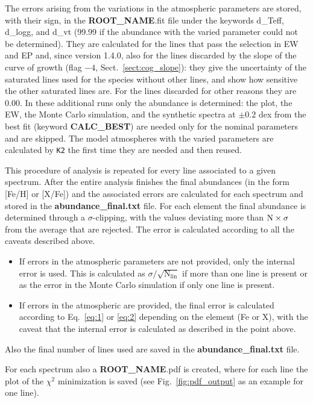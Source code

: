 \documentclass[modern]{aastex701}
\begin{document}
The errors arising from the variations in the atmospheric parameters are stored, with their sign, in the {\bf ROOT\_NAME}.fit file under the keywords d\_Teff, d\_logg, and d\_vt (99.99 if the abundance with the varied parameter could not be determined). They are calculated for the lines that pass the selection in EW and EP and, since version 1.4.0, also for the lines discarded by the slope of the curve of growth (flag $-4$, Sect.~\ref{sect:cog_slope}): they give the uncertainty of the saturated lines used for the species without other lines, and show how sensitive the other saturated lines are. For the lines discarded for other reasons they are 0.00. In these additional runs only the abundance is determined: the plot, the EW, the Monte Carlo simulation, and the synthetic spectra at $\pm 0.2$ dex from the best fit (keyword {\bf CALC\_BEST}) are needed only for the nominal parameters and are skipped. The model atmospheres with the varied parameters are calculated by \texttt{K2} the first time they are needed and then reused. 

This procedure of analysis is repeated for every line associated to a given spectrum. After the entire analysis finishes the final abundances (in the form [Fe/H] or [X/Fe]) and the associated errors are calculated for each spectrum and stored in the {\bf abundance\_final.txt} file. For each element the final abundance is determined through a $\sigma$-clipping, with the values deviating more than $\rm N\times\sigma$ from the average that are rejected. The error is calculated according to all the caveats described above. 
\begin{itemize}
    \item If errors in the atmospheric parameters are not provided, only the internal error is used. This is calculated as  $\sigma / \sqrt{\mathrm{N_{lin}}}$ if more than one line is present or as the error in the Monte Carlo simulation if only one line is present.
    \item If errors in the atmospheric are provided, the final error is calculated according to Eq.~\ref{eq:1} or \ref{eq:2} depending on the element (Fe or X), with the caveat that the internal error is calculated as described in the point above. 
\end{itemize}

Also the final number of lines used are saved in the {\bf abundance\_final.txt} file. 

For each spectrum also a {\bf ROOT\_NAME}.pdf is created, where for each line the plot of the $\chi^2$ minimization is saved (see Fig.~\ref{fig:pdf_output} as an example for one line). 
\end{document}
